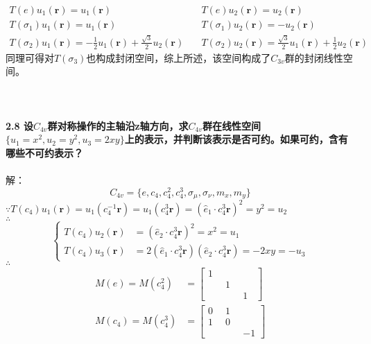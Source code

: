 \documentclass[12pt]{article}
\numberwithin{equation}{section}	 %
\begin{document}
\begin{spacing}{1.5}
\begin{align*}
T(e)u_{1}(\bm{r}) = u_{1}(\bm{r}) &\quad T(e)u_{2}(\bm{r}) = u_{2}(\bm{r}) \\
T(\sigma_{1})u_{1}(\bm{r}) = u_{1}(\bm{r}) &\quad T(\sigma_{1})u_{2}(\bm{r}) = -u_{2}(\bm{r}) \\
T(\sigma_{2})u_{1}(\bm{r}) = -\frac{1}{2}u_{1}(\bm{r}) + \frac{\sqrt{3}}{2}u_{2}(\bm{r}) &\quad T(\sigma_{2})u_{2}(\bm{r}) = \frac{\sqrt{3}}{2}u_{1}(\bm{r}) + \frac{1}{2}u_{2}(\bm{r}) 
\end{align*}
同理可得对$T(\sigma_{3})$也构成封闭空间，综上所述，该空间构成了$C_{3v}$群的封闭线性空间。\\
~\\
~\\
~\\
\textbf{2.8 \quad 设$C_{4v}$群对称操作的主轴沿z轴方向，求$C_{4v}$群在线性空间$\{u_{1}=x^{2}, u_{2}=y^{2}, u_{3}=2xy\}$上的表示，并判断该表示是否可约。如果可约，含有哪些不可约表示？}\\
~\\
解：\begin{equation}
C_{4v} = \{e,c_{4},c_{4}^{2},c_{4}^{3},\sigma_{\mu},\sigma_{\nu},m_{x},m_{y}\}
\end{equation}
$\because T(c_{4})u_{1}(\bm{r}) = u_{1}(c_{4}^{-1}\bm{r}) = u_{1}(c_{4}^{3}\bm{r}) = \left( \hat{e}_{1}\cdot c_{4}^{3}\bm{r} \right)^{2} = y^{2} = u_{2}$\\
$\therefore$
\begin{equation}\nonumber 		%
\left\{		%
\begin{aligned}
T(c_{4})u_{2}(\bm{r}) &= \left( \hat{e}_{2}\cdot c_{4}^{3}\bm{r} \right)^{2} = x^{2} = u_{1} \\
T(c_{4})u_{3}(\bm{r}) &= 2\left( \hat{e}_{1}\cdot c_{4}^{3}\bm{r} \right)\left( \hat{e}_{2}\cdot c_{4}^{3}\bm{r} \right) = -2xy = -u_{3}
\end{aligned}
\right.	%
\end{equation}
$\therefore$
\begin{align*}
M(e) = M(c_{4}^{2}) &= \begin{bmatrix} 1 & \quad & \quad \\ \quad & 1 & \quad \\ \quad & \quad & 1 \end{bmatrix} \\
M(c_{4}) = M(c_{4}^{3}) &= \begin{bmatrix} 0 & 1 & \quad \\ 1 & 0 & \quad \\ \quad & \quad & -1 \end{bmatrix} \\

\end{align*}
\end{spacing}
\end{document}
